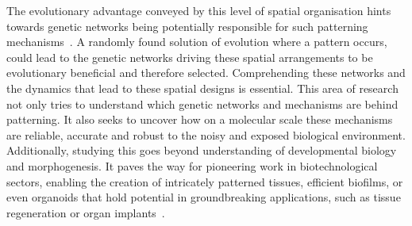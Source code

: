 The evolutionary advantage conveyed by this level of spatial organisation hints towards genetic networks being potentially responsible for such patterning mechanisms~\parencite{caro2005adaptive}.
A randomly found solution of evolution where a pattern occurs, could lead to the genetic networks driving these spatial arrangements to be evolutionary beneficial and therefore selected. %
Comprehending these networks and the dynamics that lead to these spatial designs is essential.
This area of research not only tries to understand which genetic networks and mechanisms are behind patterning.
It also seeks to uncover how on a molecular scale these mechanisms are reliable, accurate and robust to the noisy and exposed biological environment.
Additionally, studying this goes beyond understanding of developmental biology and morphogenesis.
It paves the way for pioneering work in biotechnological sectors, enabling the creation of intricately patterned tissues, efficient biofilms, or even organoids that hold potential in groundbreaking applications, such as tissue regeneration or organ implants~\parencite{Scholes2017,Tan2018}. %






%



